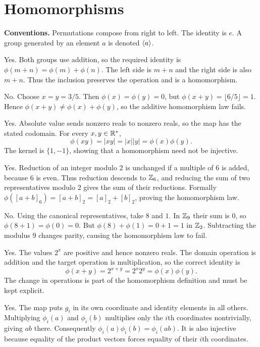 \section{Homomorphisms}
\textbf{Conventions.} Permutations compose from right to left. The identity is $e$. A group generated by an element $a$ is denoted $\langle a\rangle$.

Yes. Both groups use addition, so the required identity is $\phi(m+n)=\phi(m)+\phi(n)$. The left side is $m+n$ and the right side is also $m+n$. Thus the inclusion preserves the operation and is a homomorphism.

No. Choose $x=y=3/5$. Then $\phi(x)=\phi(y)=0$, but $\phi(x+y)=\lfloor6/5\rfloor=1$. Hence $\phi(x+y)\ne\phi(x)+\phi(y)$, so the additive homomorphism law fails.

Yes. Absolute value sends nonzero reals to nonzero reals, so the map has the stated codomain. For every $x,y\in\mathbb{R}^*$,
\[\phi(xy)=|xy|=|x||y|=\phi(x)\phi(y).\]
The kernel is $\{1,-1\}$, showing that a homomorphism need not be injective.

Yes. Reduction of an integer modulo $2$ is unchanged if a multiple of $6$ is added, because $6$ is even. Thus reduction descends to $\mathbb{Z}_6$, and reducing the sum of two representatives modulo $2$ gives the sum of their reductions. Formally $\phi([a+b]_6)=[a+b]_2=[a]_2+[b]_2$, proving the homomorphism law.

No. Using the canonical representatives, take $8$ and $1$. In $\mathbb{Z}_9$ their sum is $0$, so $\phi(8+1)=\phi(0)=0$. But $\phi(8)+\phi(1)=0+1=1$ in $\mathbb{Z}_2$. Subtracting the modulus $9$ changes parity, causing the homomorphism law to fail.

Yes. The values $2^x$ are positive and hence nonzero reals. The domain operation is addition and the target operation is multiplication, so the correct identity is
\[\phi(x+y)=2^{x+y}=2^x2^y=\phi(x)\phi(y).\]
The change in operations is part of the homomorphism definition and must be kept explicit.

Yes. The map puts $g_i$ in its own coordinate and identity elements in all others. Multiplying $\phi_i(a)$ and $\phi_i(b)$ multiplies only the $i$th coordinates nontrivially, giving $ab$ there. Consequently $\phi_i(a)\phi_i(b)=\phi_i(ab)$. It is also injective because equality of the product vectors forces equality of their $i$th coordinates.

